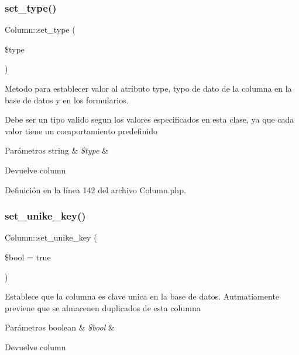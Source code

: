 \subsubsection{\texorpdfstring{set\_type()}{set\_type()}}
{\footnotesize\ttfamily Column\+::set\+\_\+type (\begin{DoxyParamCaption}\item[{}]{\$type }\end{DoxyParamCaption})}

Metodo para establecer valor al atributo type, typo de dato de la columna en la base de datos y en los formularios.

Debe ser un tipo valido segun los valores especificados en esta clase, ya que cada valor tiene un comportamiento predefinido


\begin{DoxyParams}[1]{Parámetros}
string & {\em \$type} & \\
\hline
\end{DoxyParams}
\begin{DoxyReturn}{Devuelve}
column 
\end{DoxyReturn}


Definición en la línea 142 del archivo Column.\+php.

\mbox{\label{class_column_afc2755d3457a6f80517b6ba695e793cf}} 
\subsubsection{\texorpdfstring{set\_unike\_key()}{set\_unike\_key()}}
{\footnotesize\ttfamily Column\+::set\+\_\+unike\+\_\+key (\begin{DoxyParamCaption}\item[{}]{\$bool = {\ttfamily true} }\end{DoxyParamCaption})}

Establece que la columna es clave unica en la base de datos. Autmatiamente previene que se almacenen duplicados de esta columna


\begin{DoxyParams}[1]{Parámetros}
boolean & {\em \$bool} & \\
\hline
\end{DoxyParams}
\begin{DoxyReturn}{Devuelve}
column 
\end{DoxyReturn}


